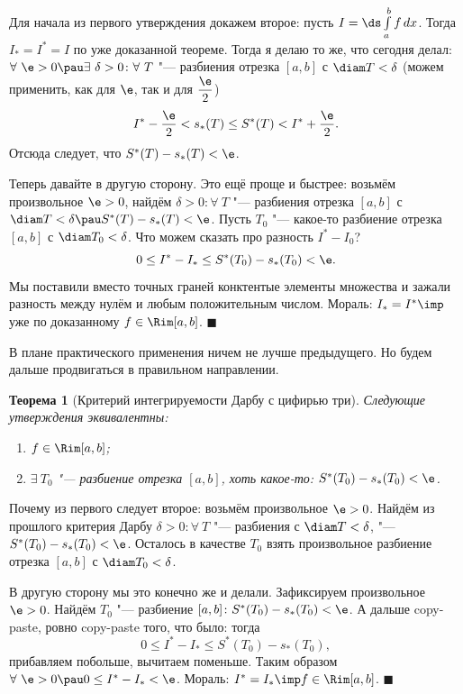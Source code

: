 \documentclass[a4paper,10pt,twoside]{article}
\newtheorem{The}{Теорема}[section]
\newenvironment{Proof}
       {\par\noindent{\textbf{Доказательство.}}}
       {\hfill$\scriptstyle\blacksquare$}
\begin{document}
 \begin{Proof}
 	Для начала из первого утверждения докажем второе: пусть $I=\ds\int\limits_a^bf\,dx$. Тогда $I_*=I^*=I$ по уже доказанной теореме.
 	Тогда я делаю то же, что сегодня делал: $\forall\ \e>0\pau\exists\ \delta>0\colon\forall\  T$ "--- разбиения отрезка $[a,b]$ с $\diam T<\delta$ (можем применить, как для $\e$, так и для $\dfrac{\e}2$)
 	$$I^*-\dfrac{\e}2<s_*(T)\leq S^*(T)<I^*+\dfrac{\e}2.$$
 	Отсюда следует, что $S^*(T)-s_*(T)<\e$.
 	
 	Теперь давайте в другую сторону. Это ещё проще и быстрее: возьмём произвольное $\e>0$, найдём $\delta>0\colon\forall\  T$ "--- разбиения
 	отрезка $[a,b]$ с $\diam T<\delta\pau S^*(T)-s_*(T)<\e$. Пусть $T_0$ "--- какое-то разбиение отрезка $[a,b]$ с $\diam T_0<\delta$.
 	Что можем сказать про разность $I^*-I_0$?
 	$$0\leq I^*-I_*\leq S^*(T_0)-s_*(T_0)<\e.$$
 	Мы поставили вместо точных граней конктентые элементы множества и зажали разность между нулём и любым положительным числом.
 	Мораль: $I_*=I^*\imp$ уже по доказанному $f\in\Rim[a,b]$.
 \end{Proof}
 
 В плане практического применения ничем не лучше предыдущего. Но будем дальше продвигаться в правильном направлении.
 
 \begin{The}[Критерий интегрируемости Дарбу с цифирью три]
 	Следующие утверждения эквивалентны:
 	\begin{enumerate}
 	  \item $f\in\Rim[a,b]$;
 	  \item $\exists\  T_0$ "--- разбиение отрезка $[a,b]$, хоть какое-то: $S^*(T_0)-s_*(T_0)<\e$.
 	\end{enumerate}
 \end{The}
 
 \begin{Proof}
 	Почему из первого следует второе: возьмём произвольное $\e>0$. Найдём из прошлого критерия Дарбу $\delta>0\colon \forall\  T$ "--- разбиения
 	с $\diam T<\delta$, "--- $S^*(T_0)-s_*(T_0)<\e$. Осталось в качестве $T_0$ взять произвольное разбиение отрезка $[a,b]$ с $\diam T_0<\delta$.
 	
 	В другую сторону мы это конечно же и делали. Зафиксируем произвольное $\e>0$. Найдём $T_0$ "--- разбиение $[a,b]\colon S^*(T_0)-s_*(T_0)<\e$.
 	А дальше copy-paste, ровно copy-paste того, что было: тогда
 	$$0\leq I^*-I_*\leq S^*(T_0)-s_*(T_0),$$
 	прибавляем побольше, вычитаем поменьше. Таким образом $\forall\ \e>0\pau0\leq I^*-I_*<\e$. Мораль: $I^*=I_*\imp f\in\Rim[a,b]$.
 \end{Proof}
 
\end{document}
